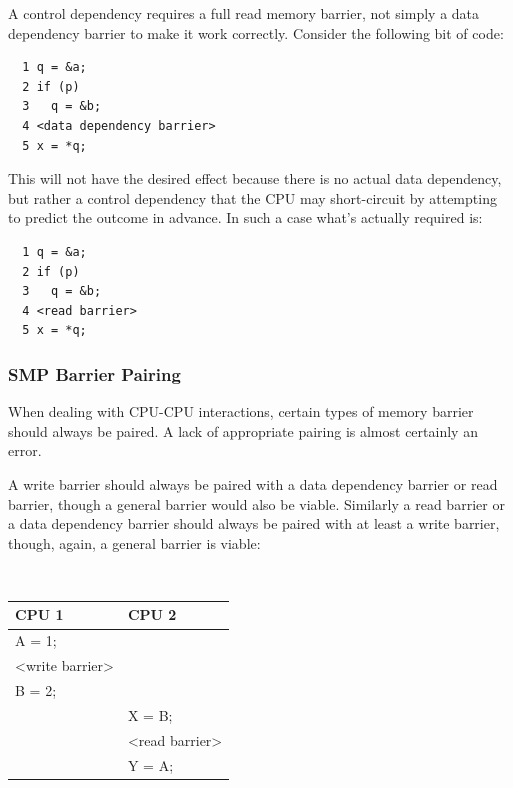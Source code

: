 A control dependency requires a full read memory barrier, not simply a data
dependency barrier to make it work correctly.  Consider the following bit of
code:

\vspace{5pt}
\begin{minipage}[t]{\columnwidth}
\scriptsize
\begin{verbatim}
  1 q = &a;
  2 if (p)
  3   q = &b;
  4 <data dependency barrier>
  5 x = *q;
\end{verbatim}
\end{minipage}
\vspace{5pt}

This will not have the desired effect because there is no actual data
dependency, but rather a control dependency that the CPU may short-circuit by
attempting to predict the outcome in advance.  In such a case what's actually
required is:

\vspace{5pt}
\begin{minipage}[t]{\columnwidth}
\scriptsize
\begin{verbatim}
  1 q = &a;
  2 if (p)
  3   q = &b;
  4 <read barrier>
  5 x = *q;
\end{verbatim}
\end{minipage}
\vspace{5pt}

\subsubsection{SMP Barrier Pairing}
\label{sec:advsync:SMP Barrier Pairing}

When dealing with CPU-CPU interactions, certain types of memory barrier should
always be paired.  A lack of appropriate pairing is almost certainly an error.

A write barrier should always be paired with a data dependency barrier or read
barrier, though a general barrier would also be viable.  Similarly a read
barrier or a data dependency barrier should always be paired with at least a
write barrier, though, again, a general barrier is viable:

\vspace{5pt}
\begin{minipage}[t]{\columnwidth}
\tt
\scriptsize
\begin{tabular}{l|p{1.5in}}
	CPU 1 &		CPU 2 \\
	\hline
	A = 1; & \\
	<write barrier> & \\
	B = 2;	&	\\
		&	X = B; \\
		&	<read barrier> \\
		&	Y = A; \\
\end{tabular}
\end{minipage}
\vspace{5pt}

